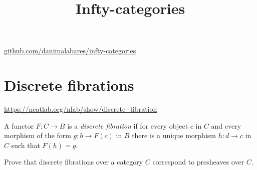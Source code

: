 



\title{Infty-categories}
\maketitle

\label{section-phantom}
\hfill
\href{http://github.com/danimalabares/infty-categories}
{github.com/danimalabares/infty-categories}

\tableofcontents

\section{Discrete fibrations}
\label{section-discrete-fibrations}

\begin{definition}
\label{definition-discrete-fibration}
\begin{reference}
\url{https://ncatlab.org/nlab/show/discrete+fibration} 
\end{reference}
A functor $F:C \to B$ is a {\it discrete fibration} if for every object
$c$ in $C$ and every morphism of the form $g: b \to F(c)$ in $B$ 
there is a unique morphism $h:d \to c$ in $C$ 
such that $F(h)=g$.
\end{definition}

\begin{exercise}
\label{exercise-discrete-fibrations-presheaves}
Prove that discrete fibrations over a category $C$ correspond to presheaves over
$C$.
\end{exercise}


